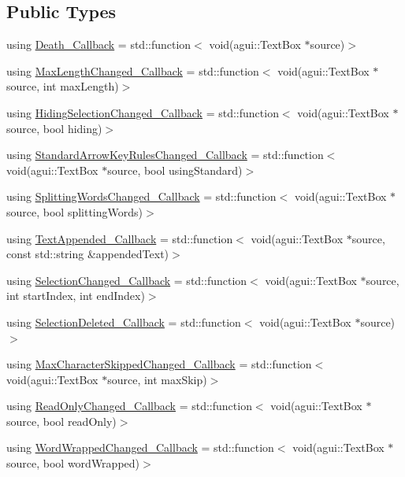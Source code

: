 \subsection*{Public Types}
\begin{DoxyCompactItemize}
\item 
using \mbox{\hyperlink{classec_1_1_generic_text_box_listener_acef5d6f448ba7f8a90e56deed9e4be68}{Death\+\_\+\+Callback}} = std\+::function$<$ void(agui\+::\+Text\+Box $\ast$source)$>$
\item 
using \mbox{\hyperlink{classec_1_1_generic_text_box_listener_ae0559ffa241ec16797f0554715b7b632}{Max\+Length\+Changed\+\_\+\+Callback}} = std\+::function$<$ void(agui\+::\+Text\+Box $\ast$source, int max\+Length)$>$
\item 
using \mbox{\hyperlink{classec_1_1_generic_text_box_listener_aed51cf39c992e6c9fd7baa1df567504e}{Hiding\+Selection\+Changed\+\_\+\+Callback}} = std\+::function$<$ void(agui\+::\+Text\+Box $\ast$source, bool hiding)$>$
\item 
using \mbox{\hyperlink{classec_1_1_generic_text_box_listener_a1099a678278dd6c888d0ba18af73979b}{Standard\+Arrow\+Key\+Rules\+Changed\+\_\+\+Callback}} = std\+::function$<$ void(agui\+::\+Text\+Box $\ast$source, bool using\+Standard)$>$
\item 
using \mbox{\hyperlink{classec_1_1_generic_text_box_listener_ac4ce805fe48ae654108a7de04e310780}{Splitting\+Words\+Changed\+\_\+\+Callback}} = std\+::function$<$ void(agui\+::\+Text\+Box $\ast$source, bool splitting\+Words)$>$
\item 
using \mbox{\hyperlink{classec_1_1_generic_text_box_listener_a7bc50ee05522edf211ca7ce6a86f16c7}{Text\+Appended\+\_\+\+Callback}} = std\+::function$<$ void(agui\+::\+Text\+Box $\ast$source, const std\+::string \&appended\+Text)$>$
\item 
using \mbox{\hyperlink{classec_1_1_generic_text_box_listener_a25c554bc062fdfdc805f7aefe981a3ea}{Selection\+Changed\+\_\+\+Callback}} = std\+::function$<$ void(agui\+::\+Text\+Box $\ast$source, int start\+Index, int end\+Index)$>$
\item 
using \mbox{\hyperlink{classec_1_1_generic_text_box_listener_af2e239586f0259a784148eb5fb3f6b4a}{Selection\+Deleted\+\_\+\+Callback}} = std\+::function$<$ void(agui\+::\+Text\+Box $\ast$source)$>$
\item 
using \mbox{\hyperlink{classec_1_1_generic_text_box_listener_a43801948fb5a222ba933b085a2f095a3}{Max\+Character\+Skipped\+Changed\+\_\+\+Callback}} = std\+::function$<$ void(agui\+::\+Text\+Box $\ast$source, int max\+Skip)$>$
\item 
using \mbox{\hyperlink{classec_1_1_generic_text_box_listener_a2046d1c27dca4b40f4bc373a3ce2be1e}{Read\+Only\+Changed\+\_\+\+Callback}} = std\+::function$<$ void(agui\+::\+Text\+Box $\ast$source, bool read\+Only)$>$
\item 
using \mbox{\hyperlink{classec_1_1_generic_text_box_listener_aa94d95c932df4d70fe03c501520f0d16}{Word\+Wrapped\+Changed\+\_\+\+Callback}} = std\+::function$<$ void(agui\+::\+Text\+Box $\ast$source, bool word\+Wrapped)$>$
\end{DoxyCompactItemize}
